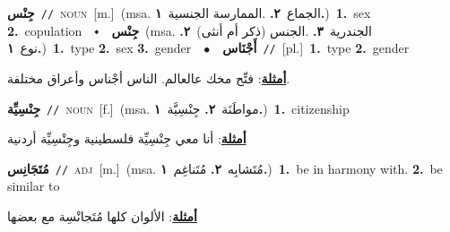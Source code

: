\documentclass[10pt,a4paper,twoside]{article} %
\begin{document}
\begin{multicols}{2}
{\setlength\topsep{0pt}\textbf{\foreignlanguage{arabic}{جِنْس}}\ {\color{gray}\texttt{//}\color{black}}\ \textsc{noun}\ [m.]\ \color{gray}(msa. \foreignlanguage{arabic}{الجماع}~\foreignlanguage{arabic}{\textbf{٢.}}  .\foreignlanguage{arabic}{الممارسة الجنسية}~\foreignlanguage{arabic}{\textbf{١.}})\color{black}\ \textbf{1.}~sex  \textbf{2.}~copulation\ \ $\smblkdiamond$\ \ \setlength\topsep{0pt}\textbf{\foreignlanguage{arabic}{جِنْس}}\ \color{gray}(msa. \foreignlanguage{arabic}{الجندرية}~\foreignlanguage{arabic}{\textbf{٣.}}  .\foreignlanguage{arabic}{الجنس (ذكر أم أنثى)}~\foreignlanguage{arabic}{\textbf{٢.}}  \foreignlanguage{arabic}{نوع}~\foreignlanguage{arabic}{\textbf{١.}})\color{black}\ \textbf{1.}~type  \textbf{2.}~sex  \textbf{3.}~gender\ \ $\bullet$\ \ \setlength\topsep{0pt}\textbf{\foreignlanguage{arabic}{أَجْنَاس}}\ {\color{gray}\texttt{//}\color{black}}\ [pl.]\ \textbf{1.}~type  \textbf{2.}~gender\  \begin{flushright}\color{gray}\foreignlanguage{arabic}{\textbf{\underline{\foreignlanguage{arabic}{أمثلة}}}: فتِّح مخك عالعالم. الناس أجْناس وأعراق مختلفة.}\end{flushright}\color{black}} \vspace{2mm}

{\setlength\topsep{0pt}\textbf{\foreignlanguage{arabic}{جِنْسِيِّة}}\ {\color{gray}\texttt{//}\color{black}}\ \textsc{noun}\ [f.]\ \color{gray}(msa. \foreignlanguage{arabic}{مواطَنَة}~\foreignlanguage{arabic}{\textbf{٢.}}  \foreignlanguage{arabic}{جِنْسِيَّة}~\foreignlanguage{arabic}{\textbf{١.}})\color{black}\ \textbf{1.}~citizenship\  \begin{flushright}\color{gray}\foreignlanguage{arabic}{\textbf{\underline{\foreignlanguage{arabic}{أمثلة}}}: أنا معي جِنْسِيِّة فلسطينية وجِنْسِيِّة أردنية}\end{flushright}\color{black}} \vspace{2mm}

{\setlength\topsep{0pt}\textbf{\foreignlanguage{arabic}{مُتَجَانِس}}\ {\color{gray}\texttt{//}\color{black}}\ \textsc{adj}\ [m.]\ \color{gray}(msa. \foreignlanguage{arabic}{مُتَشابِه}~\foreignlanguage{arabic}{\textbf{٢.}}  \foreignlanguage{arabic}{مُتَناغِم}~\foreignlanguage{arabic}{\textbf{١.}})\color{black}\ \textbf{1.}~be in harmony with.  \textbf{2.}~be similar to\  \begin{flushright}\color{gray}\foreignlanguage{arabic}{\textbf{\underline{\foreignlanguage{arabic}{أمثلة}}}: الألوان كلها مُتَجانْسِة مع بعضها}\end{flushright}\color{black}} \vspace{2mm}


\end{multicols}
\end{document}
